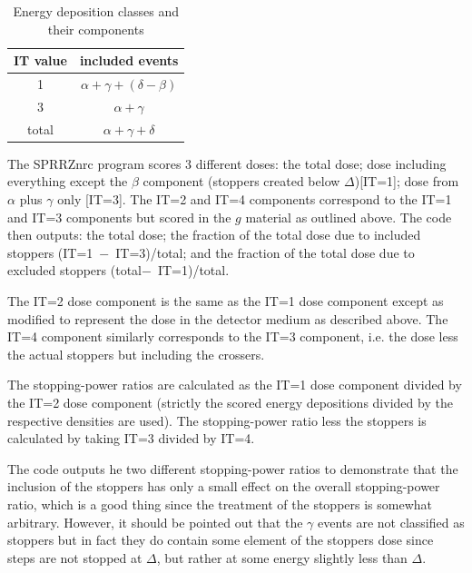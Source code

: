 \documentclass[12pt,twoside]{article}  %
\begin{document}
\begin{table}[htb]
\begin{center}
\caption{Energy deposition classes and their components}
\begin{tabular}{|cc|}
\hline
IT value & included events \\
\hline
1  & $\alpha + \gamma + (\delta -\beta)$ \\
3  & $\alpha + \gamma$\\
total & $\alpha + \gamma + \delta$ \\
\hline
\end{tabular}
\end{center}
\end{table}
The SPRRZnrc program scores 3 different doses: the total dose;
dose including everything except the
$\beta$ component (stoppers created below $\Delta$)[IT=1]; dose from
$\alpha$ plus $\gamma$ only [IT=3].
The IT=2 and IT=4 components
correspond to the IT=1 and IT=3 components but scored in the $g$ material
as outlined above. The code then outputs: the total dose; the 
fraction of the total dose due to included stoppers (IT=1~$-$~IT=3)/total;
and the fraction of the total dose due to excluded stoppers 
(total$-$~IT=1)/total. 

The IT=2 dose component is the same as the IT=1 dose component except as
modified to represent the dose in the detector medium as described above.
The IT=4 component similarly corresponds to the IT=3 component, i.e. the
dose less the actual stoppers but including the crossers.

The stopping-power ratios are calculated as the IT=1 dose component divided
by the IT=2 dose component (strictly the scored energy depositions divided
by the respective densities are used).  The stopping-power ratio less the
stoppers is calculated by taking IT=3 divided by IT=4. 

The code outputs he two different stopping-power ratios to demonstrate that
the inclusion of the stoppers has only a small effect on the overall
stopping-power ratio, which is a good thing since the treatment of the
stoppers is somewhat arbitrary.  However, it should be pointed out that the
$\gamma$ events are not classified as stoppers but in fact they do contain
some element of the stoppers dose since steps are not stopped at $\Delta$,
but rather at some energy slightly less than $\Delta$.



\end{document}
